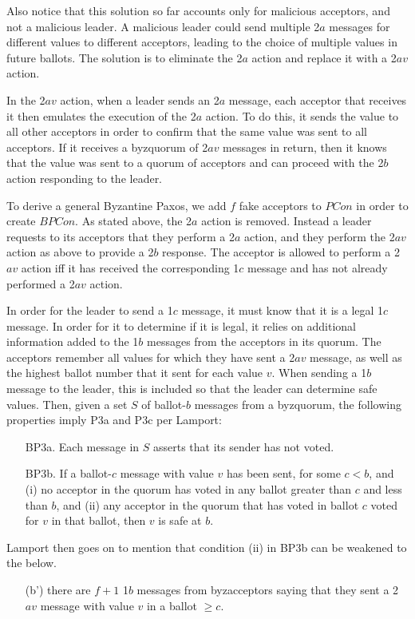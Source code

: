 \documentclass[conference]{IEEEtran}
\begin{document}
Also notice that this solution so far accounts only for malicious acceptors, and not a malicious leader. A malicious leader could send multiple 2$a$ messages for different values to different acceptors, leading to the choice of multiple values in future ballots. The solution is to eliminate the 2$a$ action and replace it with a 2$av$ action.

In the 2$av$ action, when a leader sends an 2$a$ message, each acceptor that receives it then emulates the execution of the 2$a$ action. To do this, it sends the value to all other acceptors in order to confirm that the same value was sent to all acceptors. If it receives a byzquorum of 2$av$ messages in return, then it knows that the value was sent to a quorum of acceptors and can proceed with the 2$b$ action responding to the leader.
 
To derive a general Byzantine Paxos, we add $f$ fake acceptors to $PCon$ in order to create $BPCon$. As stated above, the 2$a$ action is removed. Instead a leader requests to its acceptors that they perform a 2$a$ action, and they perform the 2$av$ action as above to provide a 2$b$ response. The acceptor is allowed to perform a 2$av$ action iff it has received the corresponding 1$c$ message and has not already performed a 2$av$ action.

In order for the leader to send a 1$c$ message, it must know that it is a legal 1$c$ message. In order for it to determine if it is legal, it relies on additional information added to the 1$b$ messages from the acceptors in its quorum. The acceptors remember all values for which they have sent a 2$av$ message, as well as the highest ballot number that it sent for each value $v$. When sending a 1$b$ message to the leader, this is included so that the leader can determine safe values. Then, given a set $S$ of ballot-$b$ messages from a byzquorum, the following properties imply P3a and P3c per Lamport:
\smallskip
\begin{enumerate}[leftmargin=4em]
\item[BP3a.] Each message in $S$ asserts that its sender has not voted.
\item[BP3b.] If a ballot-$c$ message with value $v$ has been sent, for some $c < b$, and (i) no acceptor in the quorum has voted in any ballot greater than $c$ and less than $b$, and (ii) any acceptor in the quorum that has voted in ballot $c$ voted for $v$ in that ballot, then $v$ is safe at $b$.
\end{enumerate}
\smallskip

Lamport then goes on to mention that condition (ii) in BP3b can be weakened to the below.
\smallskip
\begin{enumerate}[leftmargin=4em]
\item[(b')] there are $f + 1$ 1$b$ messages from byzacceptors saying that they
sent a 2$av$ message with value $v$ in a ballot $\geq c$.
\end{enumerate}
\smallskip
\end{document}
